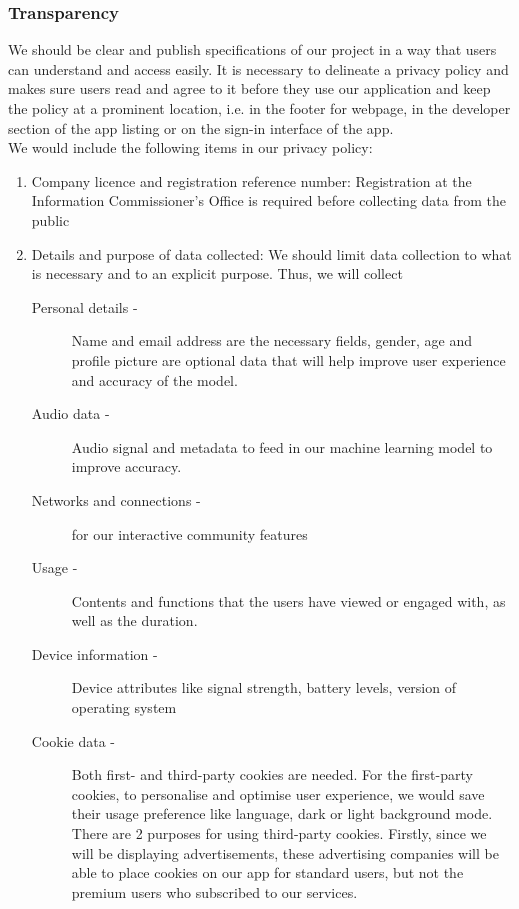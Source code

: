 \subsubsection{Transparency}
We should be clear and publish specifications of our project in a way that users can understand and access
easily. It is necessary to delineate a privacy policy and makes sure users read and agree to it before they use
our application and keep the policy at a prominent location, i.e. in the footer for webpage, in the developer
section of the app listing or on the sign-in interface of the app.\\We would include the following items in our privacy policy:
\begin{enumerate}
    \item Company licence and registration reference number: Registration at the Information Commissioner's Office is required
    before collecting data from the public
    \item Details and purpose of data collected: We should limit data collection to what is necessary and to an explicit purpose.
    Thus, we will collect
    \begin{description}
        \item[Personal details -] Name and email address are the necessary fields, gender, age and profile picture are optional data
        that will help improve user experience and accuracy of the model. 
        \item[Audio data -] Audio signal and metadata to feed in our machine learning model to improve accuracy.
        \item[Networks and connections -] for our interactive community features
        \item[Usage -] Contents and functions that the users have viewed or engaged with, as well as the duration.
        \item[Device information -] Device attributes like signal strength, battery levels, version of operating system
        \item[Cookie data -] Both first- and third-party cookies are needed. For the first-party cookies, to personalise and optimise user
        experience, we would save their usage preference like language, dark or light background mode. 
        \\There are 2 purposes for using third-party cookies. Firstly, since we will be displaying advertisements, 
        these advertising companies will be able to place cookies on our app for standard users, but not the premium users who subscribed to our services. 

\end{description}
\end{enumerate}
